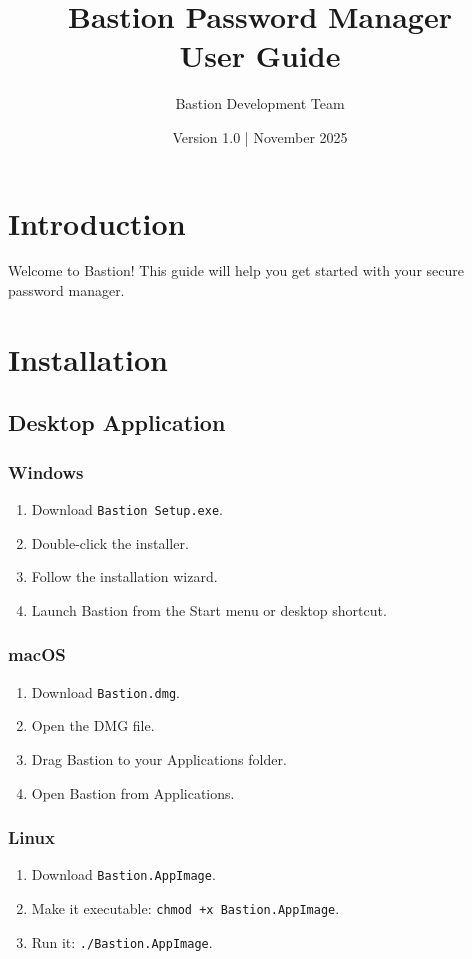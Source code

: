 \documentclass[11pt,a4paper]{article}
\title{\textbf{Bastion Password Manager} \\ User Guide}
\author{Bastion Development Team}
\date{Version 1.0 | November 2025}
\begin{document}
\maketitle
\thispagestyle{empty}
\tableofcontents
\newpage

\section{Introduction}
Welcome to Bastion! This guide will help you get started with your secure password manager.

\section{Installation}

\subsection{Desktop Application}

\subsubsection{Windows}
\begin{enumerate}
    \item Download \texttt{Bastion Setup.exe}.
    \item Double-click the installer.
    \item Follow the installation wizard.
    \item Launch Bastion from the Start menu or desktop shortcut.
\end{enumerate}

\subsubsection{macOS}
\begin{enumerate}
    \item Download \texttt{Bastion.dmg}.
    \item Open the DMG file.
    \item Drag Bastion to your Applications folder.
    \item Open Bastion from Applications.
\end{enumerate}

\subsubsection{Linux}
\begin{enumerate}
    \item Download \texttt{Bastion.AppImage}.
    \item Make it executable: \texttt{chmod +x Bastion.AppImage}.
    \item Run it: \texttt{./Bastion.AppImage}.
\end{enumerate}
\end{document}
